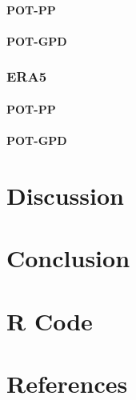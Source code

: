 \documentclass[12pt,oneside]{reedthesis}
\begin{document}
\hypertarget{pot-pp-3}{%
\subsubsection{POT-PP}\label{pot-pp-3}}

\hypertarget{pot-gpd-3}{%
\subsubsection{POT-GPD}\label{pot-gpd-3}}

\hypertarget{era5-2}{%
\subsection{ERA5}\label{era5-2}}

\hypertarget{pot-pp-4}{%
\subsubsection{POT-PP}\label{pot-pp-4}}

\hypertarget{pot-gpd-4}{%
\subsubsection{POT-GPD}\label{pot-gpd-4}}

\hypertarget{rmd-discussion}{%
\chapter{Discussion}\label{rmd-discussion}}

\hypertarget{conclusion}{%
\chapter*{Conclusion}\label{conclusion}}

\appendix

\hypertarget{r-code}{%
\chapter{R Code}\label{r-code}}

\backmatter

\hypertarget{references}{%
\chapter*{References}\label{references}}

\end{document}
